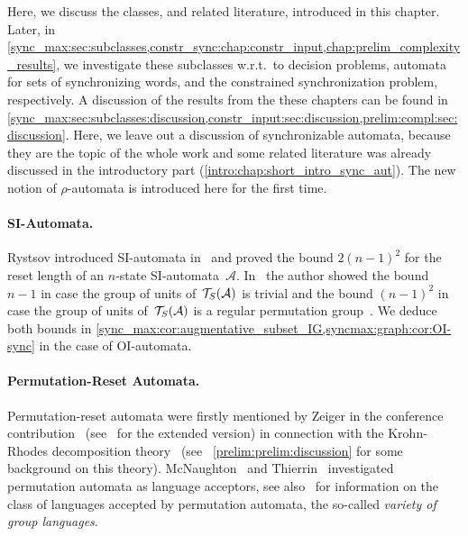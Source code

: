 
Here, we discuss the classes, and related literature, 
introduced in this chapter. 
Later, in \cref{sync_max:sec:subclasses,constr_sync:chap:constr_input,chap:prelim_complexity_results},
we investigate these subclasses w.r.t.~to decision problems, automata for sets of synchronizing
words, and the constrained synchronization problem, respectively.
A discussion of the results from the these chapters 
can be found in \cref{sync_max:sec:subclasses:discussion,constr_input:sec:discussion,prelim:compl:sec:discussion}.
Here, we leave out a discussion of synchronizable automata, because they are the topic of the whole work
and some related literature was already discussed in the introductory part (\cref{intro:chap:short_intro_sync_aut}).
The new notion of  $\rho$-automata is introduced here for the first time.

\paragraph{SI-Automata.} Rystsov introduced SI-automata in~\cite{Rystsov2000}
and proved the bound $2(n-1)^2$ for the reset length 
of an $n$-state SI-automata~$\mathcal A$.
In~\cite{Rystsov2022} the author showed the bound $n - 1$ in case the group of units of~$\mathcal T_S(\mathcal A)$ is trivial and the bound
$(n-1)^2$ in case the group of units of~$\mathcal T_S(\mathcal A)$ is a regular 
permutation group~\cite{Rystsov2022}. We deduce both bounds 
in \cref{sync_max:cor:augmentative_subset_IG,syncmax:graph:cor:OI-sync} in the case of OI-automata.

\paragraph{Permutation-Reset Automata.} Permutation-reset
automata were firstly mentioned by Zeiger
in the conference contribution~\cite{DBLP:conf/focs/Zeiger65} (see~\cite{DBLP:journals/iandc/Zeiger67a} for the extended version) 
in connection with the Krohn-Rhodes decomposition theory~\cite{KrohnRhodes65} (see \SEC~\ref{prelim:prelim:discussion}
for some background on this theory).
McNaughton~\cite{McNaughton67}
and Thierrin~\cite{DBLP:journals/mst/Thierrin68}
investigated permutation automata as language acceptors,
see also~\cite{Eilenberg1976,Pin86,DBLP:reference/hfl/Pin97} for information on the class of languages
accepted by permutation automata, the
so-called \emph{variety of group languages}. 

